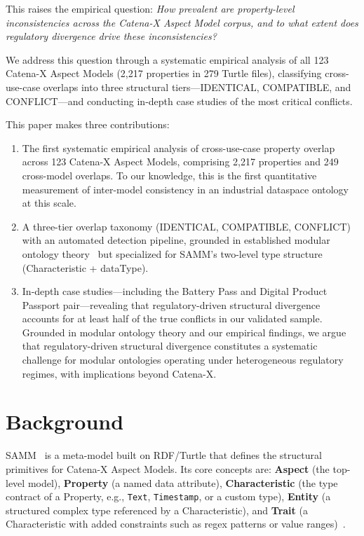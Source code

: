 \documentclass[]{ceurart}
\begin{document}
This raises the empirical question: \emph{How prevalent are
property-level inconsistencies across the Catena-X Aspect Model corpus,
and to what extent does regulatory divergence drive these
inconsistencies?}

We address this question through a systematic empirical analysis of all
123 Catena-X Aspect Models (2{,}217 properties in 279 Turtle files),
classifying cross-use-case overlaps into three structural
tiers---IDENTICAL, COMPATIBLE, and CONFLICT---and conducting in-depth
case studies of the most critical conflicts.

This paper makes three contributions:
\begin{enumerate}
  \item The first systematic empirical analysis of cross-use-case
    property overlap across 123 Catena-X Aspect Models, comprising
    2{,}217 properties and 249 cross-model overlaps. To our knowledge,
    this is the first quantitative measurement of inter-model consistency
    in an industrial dataspace ontology at this scale.
  \item A three-tier overlap taxonomy (IDENTICAL, COMPATIBLE,
    CONFLICT) with an automated detection pipeline, grounded
    in established modular ontology
    theory~\cite{oh2009ontology, stuckenschmidt2009modular} but
    specialized for SAMM's two-level type structure (Characteristic +
    dataType).
  \item In-depth case studies---including the Battery Pass and Digital
    Product Passport pair---revealing that regulatory-driven structural
    divergence accounts for at least half of the true conflicts in our
    validated sample. Grounded in modular ontology theory and our
    empirical findings, we argue that regulatory-driven structural
    divergence constitutes a systematic challenge for modular ontologies operating
    under heterogeneous regulatory regimes, with implications beyond
    Catena-X.
\end{enumerate}

\section{Background}\label{sec:background}

SAMM~\cite{samm2024} is a meta-model built on RDF/Turtle that defines the
structural primitives for Catena-X Aspect Models. Its core concepts are:
\textbf{Aspect} (the top-level model), \textbf{Property} (a named data
attribute), \textbf{Characteristic} (the type contract of a Property, e.g.,
\texttt{Text}, \texttt{Timestamp}, or a custom type), \textbf{Entity} (a
structured complex type referenced by a Characteristic), and \textbf{Trait}
(a Characteristic with added constraints such as regex patterns or value
ranges)~\cite{cx0003samm}.
\end{document}
